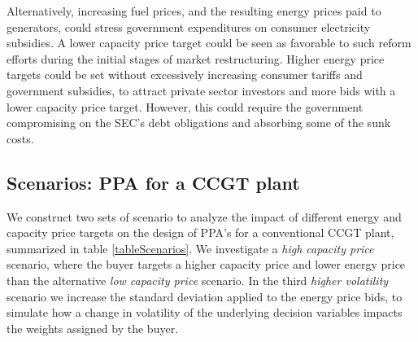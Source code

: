 \documentclass[informs]{informs3}
\begin{document}
Alternatively, increasing fuel prices, and the resulting energy prices paid to generators, could stress government expenditures on consumer electricity subsidies. A lower capacity price target could be seen as favorable to such reform efforts during the initial stages of market restructuring. Higher energy price targets could be set without excessively increasing consumer tariffs and government subsidies, to attract private sector investors and more bids with a lower capacity price target. However, this could require the government compromising on the SEC’s debt obligations and absorbing some of the sunk costs.

\subsection{Scenarios: PPA for a CCGT plant }\label{subsection_ScenarioDesign}

We construct two sets of scenario to analyze the impact of different energy and capacity price targets on the design of PPA's for a conventional CCGT plant,  summarized in table \ref{tableScenarios}. We investigate a \textit{high capacity price} scenario, where the buyer targets a higher capacity price and lower energy price than the alternative \textit{low capacity price} scenario. In the third \textit{higher volatility} scenario we increase the standard deviation applied to the energy price bids, to simulate how a change in volatility of the underlying decision variables impacts the weights assigned by the buyer.
\end{document}
